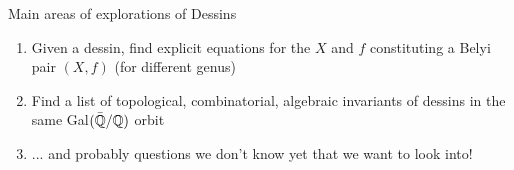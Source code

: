 \documentclass{beamer}
\newcommand{\QQ}{\mathbb{Q}}
\begin{document}

\begin{frame}{Main areas of explorations of Dessins}
    \begin{enumerate}
        \item Given a dessin, find explicit equations for the $X$ and $f$ constituting a Belyi pair $(X,f)$ (for different genus)
        \item Find a list of topological, combinatorial, algebraic invariants of dessins in the same Gal$(\Bar{\QQ} / \QQ)$ orbit
        \item ... and probably questions we don't know yet that we want to look into!
    \end{enumerate}
\end{frame}
\end{document}
